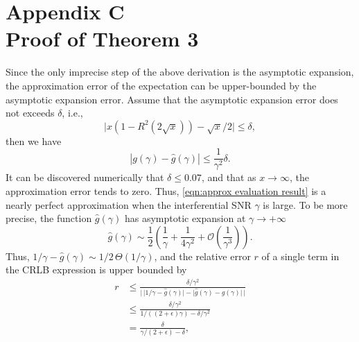 \documentclass[12pt,draftclsnofoot,journal,onecolumn]{IEEEtran}
\theoremstyle{nonumberplain}
\newcommand{\myincludegraphics}[2][width=12cm]{\texttt{[image: \#2]}}
\begin{document}
\section*{Appendix C\\ Proof of Theorem 3}
    Since the only imprecise step of the above derivation is the asymptotic expansion, the approximation error of the expectation can be upper-bounded by the asymptotic expansion error. Assume that the asymptotic expansion error does not exceeds $\delta$, i.e.,
    \begin{equation}
        \lvert x(1-R^2(2\sqrt{x}))-\sqrt{x}/2 \rvert \leq \delta,
        \label{eqn:asymptotic error}
    \end{equation}
    then we have 
    \begin{equation}
        \left| g(\gamma) - \hat{g}(\gamma)\right| \leq \frac{1}{\gamma^2} \delta. 
    \end{equation}
    It can be discovered numerically that $\delta \leq 0.07$, and that as $x\to \infty$, the approximation error tends to zero. Thus, \eqref{eqn:approx evaluation result} is a nearly perfect approximation when the interferential SNR $\gamma$ is large. To be more precise, the function $\hat{g}(\gamma)$ has asymptotic expansion at $\gamma \to +\infty$
    \begin{equation}
        \hat{g}(\gamma) \sim \frac{1}{2}\left(\frac{1}{\gamma} + \frac{1}{4\gamma^2} + \mathcal{O}(\frac{1}{\gamma^3})\right).
    \end{equation}
    Thus, $1/\gamma - \hat{g}(\gamma) \sim 1/2\,\Theta(1/\gamma)$, and the relative error $r$ of a single term in the CRLB expression is upper bounded by 
    \begin{equation}
        \begin{aligned}
        r & \leq \frac{\delta/\gamma^2}{\lvert \,\lvert 1/\gamma - \hat{g}(\gamma)\rvert - \lvert \hat{g}(\gamma) -  g(\gamma)\rvert\,\rvert} \\
        & \leq \frac{\delta/\gamma^2}{1/((2+\epsilon)\gamma) - \delta/\gamma^2} \\
        & = \frac{\delta}{\gamma/(2+\epsilon) - \delta}, \\
        \end{aligned}
    \end{equation}
\end{document}
